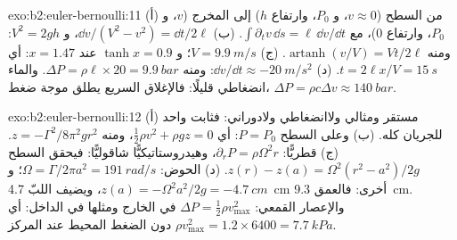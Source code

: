 \begin{solution}{exo:b2:euler-bernoulli:11}
(أ) من السطح ($v \approx 0$، و $P_0$، وارتفاع $h$) إلى المخرج ($v$، و $P_0$،
وارتفاع $0$)، مع $\int\partial_tv\,\dd s = \ell\,\dd v/\dd t$. (ب) $\dd v/(V^2 -
v^2) = \dd t/2\ell$، و $V^2 = 2gh$: ومنه $\operatorname{artanh}(v/V) = Vt/2\ell$. (ج) $V =
\qty{9.9}{m/s}$؛ و $\tanh x = 0.9$ عند $x = 1.47$: أي $t = 2\ell x/V = \qty{15}{s}$. (د)
$\dd v/\dd t \approx \qty{-20}{m/s^2}$: ومنه $\Delta P = \rho\ell \times 20 = \qty{9.9}{bar}$.
والماء انضغاطي قليلًا: فالإغلاق السريع يطلق موجة ضغط،
$\Delta P = \rho c\Delta v \approx \qty{140}{bar}$.
\end{solution}

\begin{solution}{exo:b2:euler-bernoulli:12}
(أ) مستقر ومثالي ولاانضغاطي ولادوراني: فثابت واحد
للجريان كله. (ب) وعلى السطح $P = P_0$: أي $\tfrac12\rho v^2 + \rho gz =
0$، ومنه $z = -\Gamma^2/8\pi^2gr^2$. (ج)  قطريًّا: $\partial_rP = \rho\Omega^2r$،
وهيدروستاتيكيًّا شاقوليًّا: فيحقق السطح $z(r) - z(a) = \Omega^2(r^2 -
a^2)/2g$. (د) الحوض: $\Omega = \Gamma/2\pi a^2 = \qty{191}{rad/s}$؛ و $z(a) = -\Omega^2a^2/
2g = \qty{-4.7}{cm}$، ويضيف اللبّ \qty{4.7}{cm} أخرى: فالعمق \qty{9.3}{cm}.
والإعصار القمعي: $\Delta P = \tfrac12\rho v_{\max}^2$ في الخارج ومثلها في الداخل:
أي $\rho v_{\max}^2 = 1.2 \times 6400 = \qty{7.7}{kPa}$ دون الضغط المحيط عند المركز.
\end{solution}

